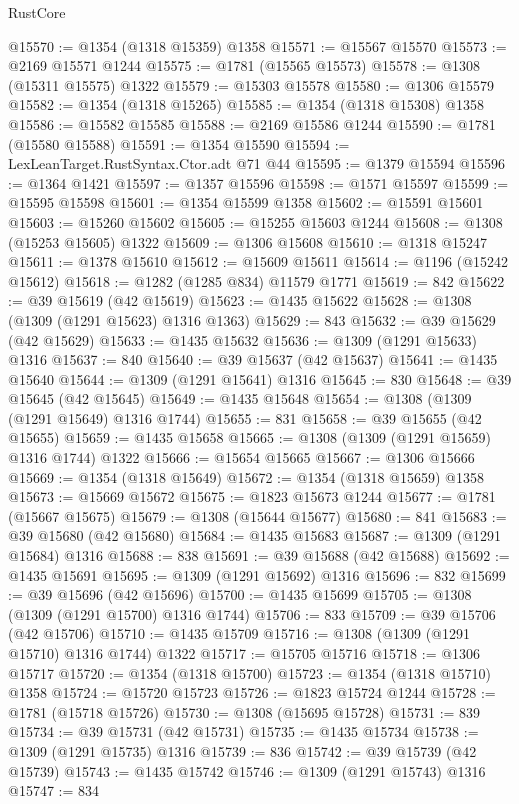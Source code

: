\begin{lexlean}{RustCore}
\begin{coremodule}
@15570 := @1354 (@1318 @15359) @1358
@15571 := @15567 @15570
@15573 := @2169 @15571 @1244
@15575 := @1781 (@15565 @15573)
@15578 := @1308 (@15311 @15575) @1322
@15579 := @15303 @15578
@15580 := @1306 @15579
@15582 := @1354 (@1318 @15265)
@15585 := @1354 (@1318 @15308) @1358
@15586 := @15582 @15585
@15588 := @2169 @15586 @1244
@15590 := @1781 (@15580 @15588)
@15591 := @1354 @15590
@15594 := LexLeanTarget.RustSyntax.Ctor.adt @71 @44
@15595 := @1379 @15594
@15596 := @1364 @1421
@15597 := @1357 @15596
@15598 := @1571 @15597
@15599 := @15595 @15598
@15601 := @1354 @15599 @1358
@15602 := @15591 @15601
@15603 := @15260 @15602
@15605 := @15255 @15603 @1244
@15608 := @1308 (@15253 @15605) @1322
@15609 := @1306 @15608
@15610 := @1318 @15247
@15611 := @1378 @15610
@15612 := @15609 @15611
@15614 := @1196 (@15242 @15612)
@15618 := @1282 (@1285 @834) @11579 @1771
@15619 := 842
@15622 := @39 @15619 (@42 @15619)
@15623 := @1435 @15622
@15628 := @1308 (@1309 (@1291 @15623) @1316 @1363)
@15629 := 843
@15632 := @39 @15629 (@42 @15629)
@15633 := @1435 @15632
@15636 := @1309 (@1291 @15633) @1316
@15637 := 840
@15640 := @39 @15637 (@42 @15637)
@15641 := @1435 @15640
@15644 := @1309 (@1291 @15641) @1316
@15645 := 830
@15648 := @39 @15645 (@42 @15645)
@15649 := @1435 @15648
@15654 := @1308 (@1309 (@1291 @15649) @1316 @1744)
@15655 := 831
@15658 := @39 @15655 (@42 @15655)
@15659 := @1435 @15658
@15665 := @1308 (@1309 (@1291 @15659) @1316 @1744) @1322
@15666 := @15654 @15665
@15667 := @1306 @15666
@15669 := @1354 (@1318 @15649)
@15672 := @1354 (@1318 @15659) @1358
@15673 := @15669 @15672
@15675 := @1823 @15673 @1244
@15677 := @1781 (@15667 @15675)
@15679 := @1308 (@15644 @15677)
@15680 := 841
@15683 := @39 @15680 (@42 @15680)
@15684 := @1435 @15683
@15687 := @1309 (@1291 @15684) @1316
@15688 := 838
@15691 := @39 @15688 (@42 @15688)
@15692 := @1435 @15691
@15695 := @1309 (@1291 @15692) @1316
@15696 := 832
@15699 := @39 @15696 (@42 @15696)
@15700 := @1435 @15699
@15705 := @1308 (@1309 (@1291 @15700) @1316 @1744)
@15706 := 833
@15709 := @39 @15706 (@42 @15706)
@15710 := @1435 @15709
@15716 := @1308 (@1309 (@1291 @15710) @1316 @1744) @1322
@15717 := @15705 @15716
@15718 := @1306 @15717
@15720 := @1354 (@1318 @15700)
@15723 := @1354 (@1318 @15710) @1358
@15724 := @15720 @15723
@15726 := @1823 @15724 @1244
@15728 := @1781 (@15718 @15726)
@15730 := @1308 (@15695 @15728)
@15731 := 839
@15734 := @39 @15731 (@42 @15731)
@15735 := @1435 @15734
@15738 := @1309 (@1291 @15735) @1316
@15739 := 836
@15742 := @39 @15739 (@42 @15739)
@15743 := @1435 @15742
@15746 := @1309 (@1291 @15743) @1316
@15747 := 834

\end{coremodule}
\end{lexlean}
